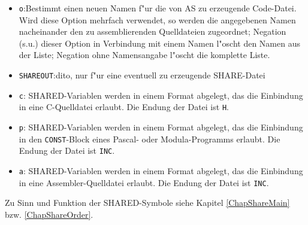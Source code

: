 \documentclass[12pt,a4paper,twoside]{report}
\newcommand{\tty}[1]{{\tt #1}}
\newcommand{\asname}{AS}
\begin{document}
\begin{itemize}
{      dargestellt, mit dem angegebenen Zeichen als Trenner.  Ein Punkt wird
      als Trenner verwendet, wenn kein Zeichen angegeben wurde.  Diese Option
      wird "ublicherweise zusammen mit der \tty{LISTRADIX}-Option verwendet;
      Listradix 8 zusammen mit einem Punkt als Trenner ergibt die sogenannte
      ''Split-Octal''-Darstellung.}
\item{\tty{o}:Bestimmt einen neuen Namen f"ur die von \asname{} zu erzeugende
      Code-Datei.  Wird diese Option mehrfach verwendet, so werden
      die angegebenen Namen nacheinander den zu assemblierenden
      Quelldateien zugeordnet; Negation (s.u.) dieser Option in
      Verbindung mit einem Namen l"oscht den Namen aus der Liste;
      Negation ohne Namensangabe l"oscht die komplette Liste.}
\item{\tty{SHAREOUT}:dito, nur f"ur eine eventuell zu erzeugende
      SHARE-Datei}
\item{\tty{c}: SHARED-Variablen werden in einem Format abgelegt, das die
      Einbindung in eine C-Quelldatei erlaubt.  Die Endung der Datei
      ist \tty{H}.}
\item{\tty{p}: SHARED-Variablen werden in einem Format abgelegt, das die
      Einbindung in den \tty{CONST}-Block eines Pascal- oder Modula-Programms
      erlaubt.  Die Endung der Datei ist \tty{INC}.}
\item{\tty{a}: SHARED-Variablen werden in einem Format abgelegt, das die
      Einbindung in eine Assembler-Quelldatei erlaubt.  Die Endung
      der Datei ist \tty{INC}.}
\end{itemize}
Zu Sinn und Funktion der SHARED-Symbole siehe Kapitel \ref{ChapShareMain}
bzw. \ref{ChapShareOrder}.
\end{document}
